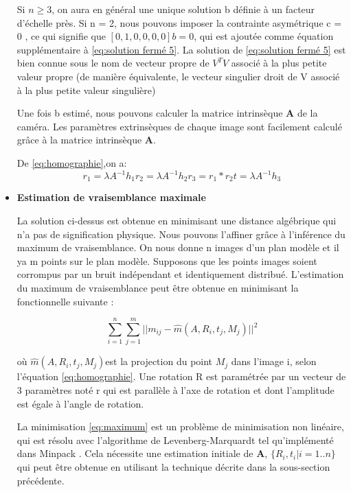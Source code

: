 \begin{itemize}[label={\Huge$\star$}]
Si $n \geq 3$, on aura en général une unique solution b définie à un facteur d'échelle près.
Si n = 2, nous pouvons imposer la contrainte asymétrique c = 0 , ce qui signifie que $[0, 1, 0, 0, 0, 0]b = 0$, qui est ajoutée comme équation supplémentaire à \ref{eq:solution fermé 5}. La solution de \ref{eq:solution fermé 5} est bien connue sous le nom de vecteur propre de $V^{T}V$ associé à la plus petite valeur propre (de manière équivalente, le vecteur singulier droit de V associé à la plus petite valeur singulière)
 
 Une fois b estimé, nous pouvons calculer la matrice intrinsèque \textbf{A} de la caméra.  
 Les paramètres extrinsèques de chaque image sont facilement calculé grâce à la matrice  intrinsèque \textbf{A}.
 
 De \ref{eq:homographie},on a: 
 \[
 r_{1}=\lambda A^{-1}h_{1}
 r_{2}=\lambda A^{-1}h_{2}
 r_{3}=r_{1}*r_{2}
 t=\lambda A^{-1}h_{3}
 \]
 
\item \textbf{Estimation de vraisemblance maximale} 
 
 La solution ci-dessus est obtenue en minimisant une distance 
 algébrique qui n'a pas de signification physique. Nous pouvons l’affiner 
 grâce à l’inférence du maximum de vraisemblance.
 On nous donne n images d’un plan modèle et il ya m points sur le 
 plan modèle. Supposons que les points images soient corrompus par un 
 bruit indépendant et identiquement distribué.
 L'estimation du maximum de vraisemblance peut être obtenue en minimisant la fonctionnelle suivante :
 
 \begin{equation}
 \sum_{i=1}^{n} \sum_{j=1}^{m} 
 ||m_{ij}-\hat{m}(A,R_{i},t_{j},M_{j})||^{2}
 \label{eq:maximum}
\end{equation}
 
 où $\hat{m}(A,R_{i},t_{j},M_{j})$est la projection du point $M_{j}$  dans l'image i, selon l'équation \ref{eq:homographie}. Une rotation R est paramétrée par un vecteur de 3 paramètres noté r qui est parallèle à l'axe de rotation et dont l'amplitude est égale à l'angle de rotation.  
 
 La minimisation  \ref{eq:maximum} est un problème de minimisation non 
 linéaire, qui est résolu avec l'algorithme de Levenberg-Marquardt tel 
 qu'implémenté dans Minpack \cite{watson_levenberg-marquardt_1978}. Cela nécessite une estimation initiale 
 de \textbf{A}, $\{R_i, t_i|i = 1..n\}$ qui peut être obtenue en utilisant la technique 
 décrite dans la sous-section précédente.
 

\end{itemize}

